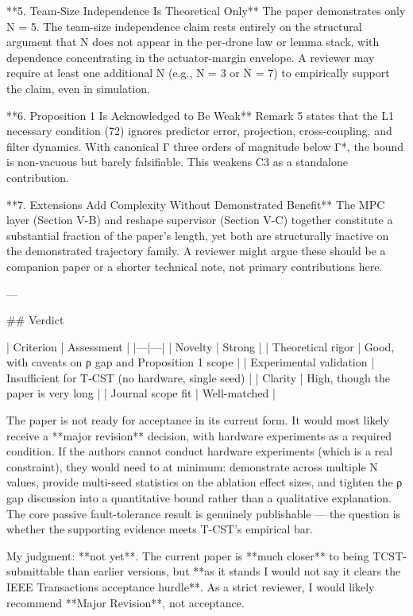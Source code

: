 **5. Team-Size Independence Is Theoretical Only**
The paper demonstrates only N = 5. The team-size independence claim rests entirely on the structural argument that N does not appear in the per-drone law or lemma stack, with dependence concentrating in the actuator-margin envelope. A reviewer may require at least one additional N (e.g., N = 3 or N = 7) to empirically support the claim, even in simulation.

**6. Proposition 1 Is Acknowledged to Be Weak**
Remark 5 states that the L1 necessary condition (72) ignores predictor error, projection, cross-coupling, and filter dynamics. With canonical Γ three orders of magnitude below Γ*, the bound is non-vacuous but barely falsifiable. This weakens C3 as a standalone contribution.

**7. Extensions Add Complexity Without Demonstrated Benefit**
The MPC layer (Section V-B) and reshape supervisor (Section V-C) together constitute a substantial fraction of the paper's length, yet both are structurally inactive on the demonstrated trajectory family. A reviewer might argue these should be a companion paper or a shorter technical note, not primary contributions here.

---

## Verdict

| Criterion | Assessment |
|---|---|
| Novelty | Strong |
| Theoretical rigor | Good, with caveats on ρ gap and Proposition 1 scope |
| Experimental validation | Insufficient for T-CST (no hardware, single seed) |
| Clarity | High, though the paper is very long |
| Journal scope fit | Well-matched |

The paper is not ready for acceptance in its current form. It would most likely receive a **major revision** decision, with hardware experiments as a required condition. If the authors cannot conduct hardware experiments (which is a real constraint), they would need to at minimum: demonstrate across multiple N values, provide multi-seed statistics on the ablation effect sizes, and tighten the ρ gap discussion into a quantitative bound rather than a qualitative explanation. The core passive fault-tolerance result is genuinely publishable — the question is whether the supporting evidence meets T-CST's empirical bar.





My judgment: **not yet**. The current paper is **much closer** to being TCST-submittable than earlier versions, but **as it stands I would not say it clears the IEEE Transactions acceptance hurdle**. As a strict reviewer, I would likely recommend **Major Revision**, not acceptance.

